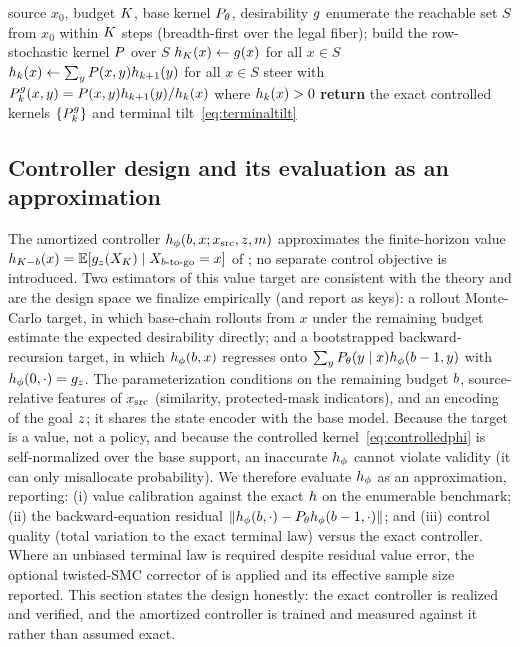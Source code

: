 \begin{algorithm}[h]
\caption{Exact enumerable controller (ground truth)}
\label{alg:exact}
\begin{algorithmic}[1]
\REQUIRE source $x_0$, budget $K$, base kernel $P_\theta$, desirability $g$
\STATE enumerate the reachable set $S$ from $x_0$ within $K$ steps (breadth-first over the legal
       fiber); build the row-stochastic kernel $P$ over $S$
\STATE $h_{K}(x)\gets g(x)$ for all $x\in S$
  \STATE $h_k(x)\gets \sum_{y}P(x,y)h_{k+1}(y)$ for all $x\in S$
\ENDFOR
\STATE steer with $P^{g}_k(x,y)=P(x,y)h_{k+1}(y)/h_k(x)$ where $h_k(x)>0$
\STATE \textbf{return} the exact controlled kernels $\{P^{g}_k\}$ and terminal
       tilt~\eqref{eq:terminaltilt}
\end{algorithmic}
\end{algorithm}

\subsection{Controller design and its evaluation as an approximation}
\label{app:controller}

The amortized controller $h_\phi(b,x;x_{\mathrm{src}},z,m)$ approximates the finite-horizon value $h_{K-b}
(x)=\mathbb{E}[g_z(X_K)\mid X_{b\text{-to-go}}=x]$ of ; no separate control
objective is introduced. Two estimators of this value target are consistent with the theory and are the
design space we finalize empirically (and report as  keys): a rollout Monte-Carlo
target, in which base-chain rollouts from $x$ under the remaining budget estimate the expected
desirability directly; and a bootstrapped backward-recursion target, in which $h_\phi(b,x)$
regresses onto $\sum_yP_\theta(y\mid x)h_\phi(b-1,y)$ with $h_\phi(0,\cdot)=g_z$.
The parameterization conditions on the remaining budget $b$, source-relative features of $x_{\mathrm{src}}$
(similarity, protected-mask indicators), and an encoding of the goal $z$; it shares the state encoder
with the base model. Because the target is a value, not a policy, and because the controlled
kernel~\eqref{eq:controlledphi} is self-normalized over the base support, an inaccurate $h_\phi$
cannot violate validity (it can only misallocate probability). We therefore evaluate $h_\phi$ as an
approximation, reporting: (i) value calibration against the exact $h$ on the enumerable benchmark;
(ii) the backward-equation residual $\lVert h_\phi(b,\cdot)-P_\theta h_\phi(b-1,\cdot)
\rVert$; and (iii) control quality (total variation to the exact terminal law) versus the exact
controller. Where an unbiased terminal law is required despite residual value error, the optional
twisted-SMC corrector of  is applied and its effective sample size reported. This
section states the design honestly: the exact controller is realized and verified, and the amortized
controller is trained and measured against it rather than assumed exact.
